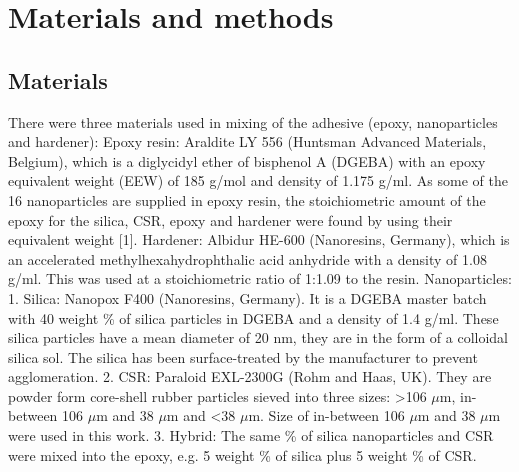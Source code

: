\documentclass[numbers=noendperiod,chapterprefix=on]{icldt} %
\begin{document}
\section{Materials and methods}
\subsection{Materials}
There were three materials used in mixing of the adhesive (epoxy, nanoparticles and hardener):
Epoxy resin: Araldite LY 556 (Huntsman Advanced Materials, Belgium), which is a diglycidyl ether of bisphenol A (DGEBA) with an epoxy equivalent weight (EEW) of 185 g/mol and density of 1.175 g/ml. As some of the
16
nanoparticles are supplied in epoxy resin, the stoichiometric amount of the epoxy for the silica, CSR, epoxy and hardener were found by using their equivalent weight [1].
Hardener: Albidur HE-600 (Nanoresins, Germany), which is an accelerated methylhexahydrophthalic acid anhydride with a density of 1.08 g/ml. This was used at a stoichiometric ratio of 1:1.09 to the resin.
Nanoparticles:
1. Silica: Nanopox F400 (Nanoresins, Germany). It is a DGEBA master batch with 40 weight \% of silica particles in DGEBA and a density of 1.4 g/ml. These silica particles have a mean diameter of 20 nm, they are in the form of a colloidal silica sol. The silica has been surface-treated by the manufacturer to prevent agglomeration.
2. CSR: Paraloid EXL-2300G (Rohm and Haas, UK). They are powder form core-shell rubber particles sieved into three sizes: >106 $\mu$m, in-between 106 $\mu$m and 38 $\mu$m and <38 $\mu$m. Size of in-between 106 $\mu$m and 38 $\mu$m were used in this work.
3. Hybrid: The same \% of silica nanoparticles and CSR were mixed into the epoxy, e.g. 5 weight \% of silica plus 5 weight \% of CSR.
\end{document}
